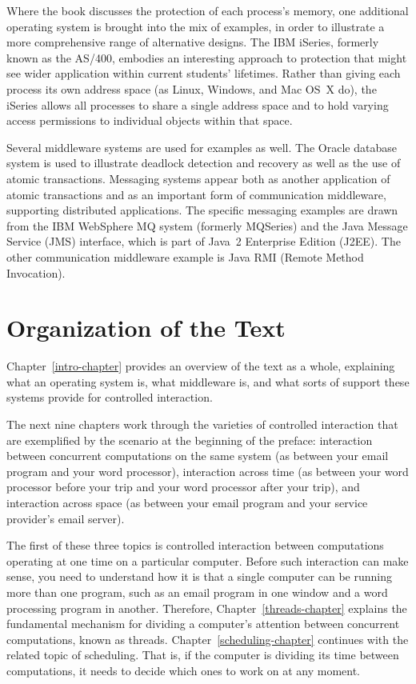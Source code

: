 Where the book discusses the protection of each process's memory, one
additional operating system is brought into the mix of examples, in
order to illustrate a more comprehensive range of alternative
designs.  The IBM iSeries, formerly known as the AS/400, embodies an
interesting approach to protection that might see wider application
within current students' lifetimes.  Rather than giving each process
its own address space (as Linux, Windows, and Mac OS~X do), the
iSeries allows all processes to share a single address space and to
hold varying access permissions to individual objects within that
space.

Several middleware systems are used for examples as well.  The Oracle
database system is used to illustrate deadlock detection and recovery
as well as the use of atomic transactions.  Messaging systems appear
both as another application of atomic transactions and as an important
form of communication middleware, supporting distributed
applications.  The specific messaging examples are drawn from the IBM
WebSphere MQ system (formerly MQSeries) and the Java
Message Service (JMS) interface, which is part of Java~2 Enterprise
Edition (J2EE).  The other communication middleware example is Java
RMI (Remote Method Invocation).

\section*{Organization of the Text}

Chapter~\ref{intro-chapter} provides an overview of the text as a
whole, explaining what an operating system is, what middleware is, and
what sorts of support these systems provide for controlled
interaction.

The next nine chapters work through the varieties of controlled
interaction that are exemplified by the scenario at the beginning of
the preface: interaction between concurrent computations on the same
system (as between your email program and your word processor),
interaction across time (as between your word processor before your
trip and your word processor after your trip), and interaction across
space (as between your email program and your service provider's email
server).

The first of these three topics is controlled interaction between
computations operating at one time on a particular computer.  Before
such interaction can make sense, you need to understand how it is that
a single computer can be running more than one program, such as an
email program in one window and a word processing program in another.
Therefore, Chapter~\ref{threads-chapter} explains the fundamental
mechanism for dividing a computer's attention between concurrent
computations, known as threads.  Chapter~\ref{scheduling-chapter}
continues with the related topic of scheduling.  That is, if the
computer is dividing its time between computations, it needs to decide
which ones to work on at any moment.

